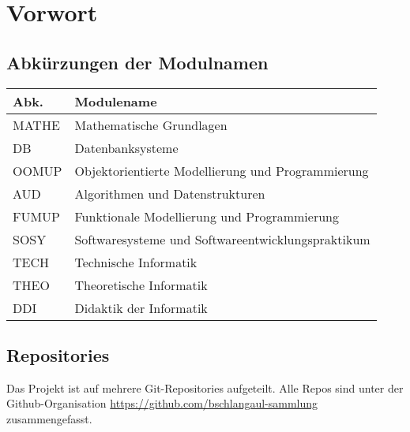\documentclass{bschlangaul-basis}
\begin{document}
\section{Vorwort}

%

\subsection{Abkürzungen der Modulnamen}

\begin{tabular}{|l|l|}
Abk.  & Modulename                                        \\\hline
MATHE & Mathematische Grundlagen                          \\
DB    & Datenbanksysteme                                  \\
OOMUP & Objektorientierte Modellierung und Programmierung \\
AUD   & Algorithmen und Datenstrukturen                   \\
FUMUP & Funktionale Modellierung und Programmierung       \\
SOSY  & Softwaresysteme und Softwareentwicklungspraktikum \\
TECH  & Technische Informatik                             \\
THEO  & Theoretische Informatik                           \\
DDI   & Didaktik der Informatik                           \\
\end{tabular}

%

\subsection{Repositories}

Das Projekt ist auf mehrere Git-Repositories aufgeteilt. Alle Repos
sind unter der Github-Organisation
\url{https://github.com/bschlangaul-sammlung} zusammengefasst.

\def\TmpRepo#1#2{\item[#1] \strut \par

{\footnotesize \url{https://github.com/bschlangaul-sammlung/#1}}

\par #2

}
\end{document}
